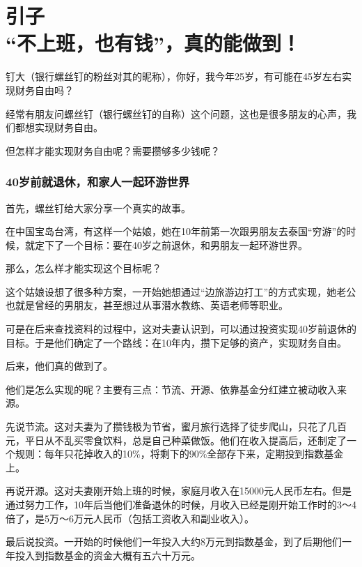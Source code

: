 \section*{引子\\ “不上班，也有钱”，真的能做到！}

{\kaishu 钉大（银行螺丝钉的粉丝对其的昵称），你好，我今年25岁，有可能在45岁左右实现财务自由吗？}

经常有朋友问螺丝钉（银行螺丝钉的自称）这个问题，这也是很多朋友的心声，我们都想实现财务自由。

但怎样才能实现财务自由呢？需要攒够多少钱呢？

\subsubsection{40岁前就退休，和家人一起环游世界}

首先，螺丝钉给大家分享一个真实的故事。

{\kaishu 在中国宝岛台湾，有这样一个姑娘，她在10年前第一次跟男朋友去泰国“穷游”的时候，就定下了一个目标：要在40岁之前退休，和男朋友一起环游世界。}

{\kaishu 那么，怎么样才能实现这个目标呢？}

{\kaishu 这个姑娘设想了很多种方案，一开始她想通过“边旅游边打工”的方式实现，她老公也就是曾经的男朋友，甚至想过从事潜水教练、英语老师等职业。}

{\kaishu 可是在后来查找资料的过程中，这对夫妻认识到，可以通过投资实现40岁前退休的目标。于是他们确定了一个路线：在10年内，攒下足够的资产，实现财务自由。}

{\kaishu 后来，他们真的做到了。}

他们是怎么实现的呢？主要有三点：节流、开源、依靠基金分红建立被动收入来源。

先说节流。这对夫妻为了攒钱极为节省，蜜月旅行选择了徒步爬山，只花了几百元，平日从不乱买零食饮料，总是自己种菜做饭。他们在收入提高后，还制定了一个规则：每年只花掉收入的10\%，将剩下的90\%全部存下来，定期投到指数基金上。

再说开源。这对夫妻刚开始上班的时候，家庭月收入在15000元人民币左右。但是通过努力工作，10年后当他们准备退休的时候，月收入已经是刚开始工作时的3～4倍了，是5万～6万元人民币（包括工资收入和副业收入）。

最后说投资。一开始的时候他们一年投入大约8万元到指数基金，到了后期他们一年投入到指数基金的资金大概有五六十万元。


